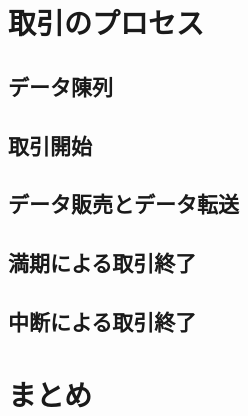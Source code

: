 \section{取引のプロセス}
\subsection{データ陳列}
\subsection{取引開始}
\subsection{データ販売とデータ転送}
\subsection{満期による取引終了}
\subsection{中断による取引終了}
\section{まとめ}



